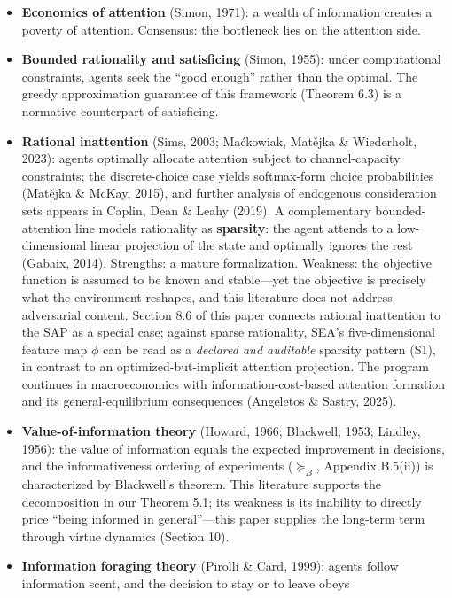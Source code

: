 \documentclass[
  11pt]{article}
\providecommand{\tightlist}{%
  \setlength{\itemsep}{0pt}\setlength{\parskip}{0pt}}
\begin{document}
\begin{itemize}
\tightlist
\item
  \textbf{Economics of attention} (Simon, 1971): a wealth of information
  creates a poverty of attention. Consensus: the bottleneck lies on the
  attention side.
\item
  \textbf{Bounded rationality and satisficing} (Simon, 1955): under
  computational constraints, agents seek the ``good enough'' rather than
  the optimal. The greedy approximation guarantee of this framework
  (Theorem 6.3) is a normative counterpart of satisficing.
\item
  \textbf{Rational inattention} (Sims, 2003; Maćkowiak, Matějka \&
  Wiederholt, 2023): agents optimally allocate attention subject to
  channel-capacity constraints; the discrete-choice case yields
  softmax-form choice probabilities (Matějka \& McKay, 2015), and
  further analysis of endogenous consideration sets appears in Caplin,
  Dean \& Leahy (2019). A complementary bounded-attention line models
  rationality as \textbf{sparsity}: the agent attends to a
  low-dimensional linear projection of the state and optimally ignores
  the rest (Gabaix, 2014). Strengths: a mature formalization. Weakness:
  the objective function is assumed to be known and stable---yet the
  objective is precisely what the environment reshapes, and this
  literature does not address adversarial content. Section 8.6 of this
  paper connects rational inattention to the SAP as a special case;
  against sparse rationality, SEA's five-dimensional feature map
  \(\phi\) can be read as a \emph{declared and auditable} sparsity
  pattern (S1), in contrast to an optimized-but-implicit attention
  projection. The program continues in macroeconomics with
  information-cost-based attention formation and its general-equilibrium
  consequences (Angeletos \& Sastry, 2025).
\item
  \textbf{Value-of-information theory} (Howard, 1966; Blackwell, 1953;
  Lindley, 1956): the value of information equals the expected
  improvement in decisions, and the informativeness ordering of
  experiments (\(\succeq_B\), Appendix B.5(ii)) is characterized by
  Blackwell's theorem. This literature supports the decomposition in our
  Theorem 5.1; its weakness is its inability to directly price ``being
  informed in general''---this paper supplies the long-term term through
  virtue dynamics (Section 10).
\item
  \textbf{Information foraging theory} (Pirolli \& Card, 1999): agents
  follow information scent, and the decision to stay or to leave obeys

\end{itemize}
\end{document}
